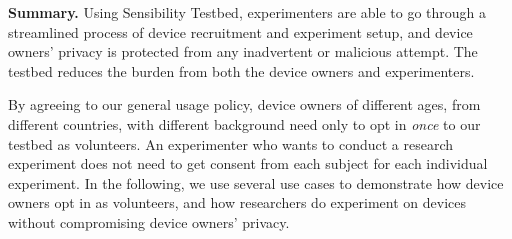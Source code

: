 \smallskip
\textbf{Summary.}
%
%
Using Sensibility Testbed, experimenters are able to go 
through a streamlined process of device recruitment and 
experiment setup, and device owners' privacy is protected
from any inadvertent or malicious attempt.
The testbed reduces the burden from both the device owners and
experimenters. 

By agreeing to our general usage policy, device 
owners of different ages, from different countries, with different
background need only to opt in \textit{once} to our testbed as 
volunteers. An experimenter who wants to conduct a research 
experiment 
does not need to get consent from each subject for each individual
experiment. 
In the following, we use several use cases to
demonstrate how device owners opt in as volunteers, and how
researchers do experiment on devices without compromising device
owners' privacy.

